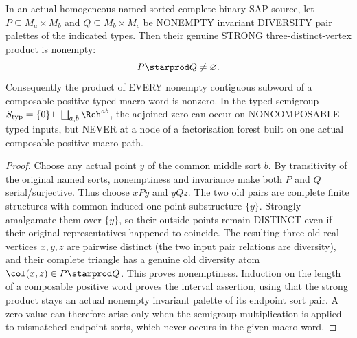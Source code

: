 \begin{lemma}
\label{lem:typed-composable-products-nonzero}
In an actual homogeneous
named-sorted complete binary
SAP source, let
\(P\subseteq M_a\times M_b\)
and \(Q\subseteq M_b\times M_c\)
be NONEMPTY invariant
DIVERSITY pair palettes
of the indicated types.
Then their genuine STRONG
three-distinct-vertex
product is nonempty:
\[
                    P\starprod Q\ne\varnothing .
\]
Consequently the product of
EVERY nonempty contiguous
subword of a composable
positive typed macro word
is nonzero. In the typed
semigroup
\(S_{\rm typ}=\{0\}
 \sqcup\bigsqcup_{a,b}\Rch^{ab}\),
the adjoined zero can occur
on NONCOMPOSABLE typed inputs,
but NEVER at a node of a
factorisation forest built on
one actual composable positive
macro path.
\end{lemma}
\begin{proof}
Choose any actual point \(y\)
of the common middle sort
\(b\). By transitivity of
the original named sorts,
nonemptiness and invariance
make both \(P\) and \(Q\)
serial/surjective. Thus choose
\(xP y\) and \(yQ z\).
The two old pairs are
complete finite structures
with common induced
one-point substructure
\(\{y\}\). Strongly amalgamate
them over \(\{y\}\), so their
outside points remain
DISTINCT even if their
original representatives
happened to coincide.
The resulting three old
real vertices \(x,y,z\)
are pairwise distinct
(the two input pair
relations are diversity),
and their complete
triangle has a genuine
old diversity atom
\(\col(x,z)\in
 P\starprod Q\).
This proves nonemptiness.
Induction on the length of
a composable positive word
proves the interval
assertion, using that the
strong product stays an
actual nonempty invariant
palette of its endpoint
sort pair. A zero value
can therefore arise only
when the semigroup
multiplication is applied
to mismatched endpoint
sorts, which never occurs
in the given macro word.
\end{proof}

